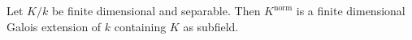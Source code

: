 Let $K/k$ be finite dimensional and separable. Then $K^{\text{norm}}$ is a finite dimensional Galois extension of $k$ containing $K$ as subfield.
